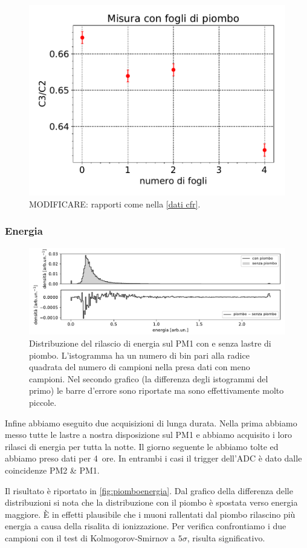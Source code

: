 \begin{figure}[h]
\centering
\includegraphics[width=8 cm]{confronto}
\caption{MODIFICARE: rapporti come nella \autoref{dati cfr}.}
\label{cfr}
\end{figure}

\subsubsection{Energia}

\begin{figure}
	\hspace{-7.5em}
	\includegraphics[width=1.4\textwidth]{piombo_energia}
	\caption{\label{fig:piomboenergia}
	Distribuzione del rilascio di energia sul PM1 con e senza lastre di piombo.
	L'istogramma ha un numero di bin pari alla radice quadrata del numero di campioni nella presa dati con meno campioni.
	Nel secondo grafico (la differenza degli istogrammi del primo)
	le barre d'errore sono riportate ma sono effettivamente molto piccole.}
\end{figure}

Infine abbiamo eseguito due acquisizioni di lunga durata.
Nella prima abbiamo messo tutte le lastre a nostra disposizione sul PM1
e abbiamo acquisito i loro rilasci di energia per tutta la notte.
Il giorno seguente le abbiamo tolte ed abbiamo preso dati per \SI{4}{ore}.
In entrambi i casi il trigger dell'ADC è dato dalle coincidenze PM2 \& PM1.

Il risultato è riportato in \autoref{fig:piomboenergia}.
Dal grafico della differenza delle distribuzioni
si nota che la distribuzione con il piombo è spostata verso energia maggiore.
È in effetti plausibile che i muoni rallentati dal piombo
rilascino più energia a causa della risalita di ionizzazione.
Per verifica confrontiamo i due campioni con il test di Kolmogorov-Smirnov a $5\sigma$,
risulta significativo.
